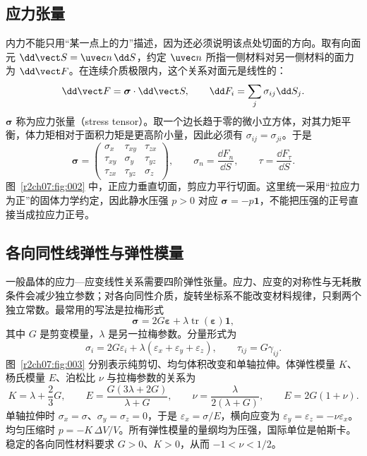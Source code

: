 \subsection{应力张量}
\label{r2ch07:sec:strainstress}

内力不能只用“某一点上的力”描述，因为还必须说明该点处切面的方向。取有向面元 $\dd\vect S=\uvec n\,\dd S$，约定 $\uvec n$ 所指一侧材料对另一侧材料的面力为 $\dd\vect F$。在连续介质极限内，这个关系对面元是线性的：
\begin{equation}
 \dd\vect F=\boldsymbol\sigma\cdot\dd\vect S,\qquad
 \dd F_i=\sum_j\sigma_{ij}\dd S_j.
 \label{r2ch07:eq:005}
\end{equation}
$\boldsymbol\sigma$ 称为应力张量（stress tensor）。取一个边长趋于零的微小立方体，对其力矩平衡，体力矩相对于面积力矩是更高阶小量，因此必须有 $\sigma_{ij}=\sigma_{ji}$。于是
\begin{equation}
 \boldsymbol\sigma=
 \begin{pmatrix}
 \sigma_x&\tau_{xy}&\tau_{zx}\\
 \tau_{xy}&\sigma_y&\tau_{yz}\\
 \tau_{zx}&\tau_{yz}&\sigma_z
 \end{pmatrix},\qquad
 \sigma_n=\frac{\dd F_n}{\dd S},\qquad
 \tau=\frac{\dd F_\tau}{\dd S}.
 \label{r2ch07:eq:006}
\end{equation}
图~\ref{r2ch07:fig:002} 中，正应力垂直切面，剪应力平行切面。这里统一采用“拉应力为正”的固体力学约定，因此静水压强 $p>0$ 对应 $\boldsymbol\sigma=-p\boldsymbol 1$，不能把压强的正号直接当成拉应力正号。
\figStress

\subsection{各向同性线弹性与弹性模量}
\label{r2ch07:sec:constitutive}

一般晶体的应力—应变线性关系需要四阶弹性张量。应力、应变的对称性与无耗散条件会减少独立参数；对各向同性介质，旋转坐标系不能改变材料规律，只剩两个独立常数。最常用的写法是拉梅形式
\begin{equation}
 \boxed{\boldsymbol\sigma=2G\boldsymbol\varepsilon
 +\lambda\operatorname{tr}(\boldsymbol\varepsilon)\boldsymbol 1},
 \label{r2ch07:eq:007}
\end{equation}
其中 $G$ 是剪变模量，$\lambda$ 是另一拉梅参数。分量形式为
\begin{equation}
 \sigma_i=2G\varepsilon_i+\lambda(\varepsilon_x+\varepsilon_y+\varepsilon_z),
 \qquad \tau_{ij}=G\gamma_{ij}.
 \label{r2ch07:eq:008}
\end{equation}
图~\ref{r2ch07:fig:003} 分别表示纯剪切、均匀体积改变和单轴拉伸。体弹性模量 $K$、杨氏模量 $E$、泊松比 $\nu$ 与拉梅参数的关系为
\begin{equation}
 K=\lambda+\frac23G,\qquad
 E=\frac{G(3\lambda+2G)}{\lambda+G},\qquad
 \nu=\frac{\lambda}{2(\lambda+G)},\qquad
 E=2G(1+\nu).
 \label{r2ch07:eq:009}
\end{equation}
单轴拉伸时 $\sigma_x=\sigma$、$\sigma_y=\sigma_z=0$，于是 $\varepsilon_x=\sigma/E$，横向应变为 $\varepsilon_y=\varepsilon_z=-\nu\varepsilon_x$。均匀压缩时 $p=-K\,\Delta V/V$。所有弹性模量的量纲均为压强，国际单位是帕斯卡。稳定的各向同性材料要求 $G>0$、$K>0$，从而 $-1<\nu<1/2$。
\figElasticModuli

